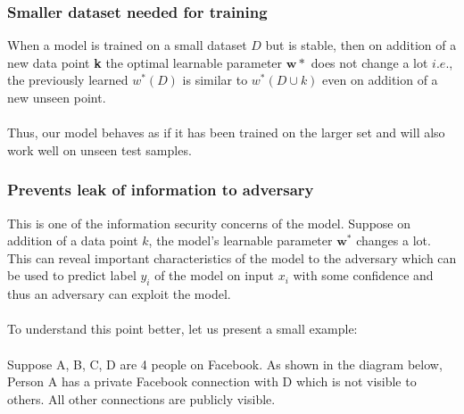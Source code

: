\documentclass[12pt]{article}
\begin{document}
\subsubsection{Smaller dataset needed for training}
    When a model is trained on a small dataset $D$ but is stable, then on addition of a new data point \textbf{k} the optimal learnable parameter $\boldsymbol{w*}$ does not change a lot $i.e.$, the previously learned $w^*(D)$ is similar to $w^*(D \cup k)$ even on addition of a new unseen point. \\
    \\
    Thus, our model behaves as if it has been trained on the larger set and will also work well on unseen test samples.    
\subsubsection{Prevents leak of information to adversary}
    This is one of the information security concerns of the model. Suppose on addition of a data point $k$, the model's learnable parameter $\boldsymbol{w}^*$ changes a lot. This can reveal important characteristics of the model to the adversary which can be used to predict label $y_i$ of the model on input $x_i$ with some confidence and thus an adversary can exploit the model.
    \\
    \\ To understand this point better, let us present a small example:\\
    \\
    Suppose A, B, C, D are 4 people on Facebook. As shown in the diagram below, Person A has a private Facebook connection with D which is not visible to others. All other connections are publicly visible. \\
    \begin{center}
\end{center}
\end{document}
